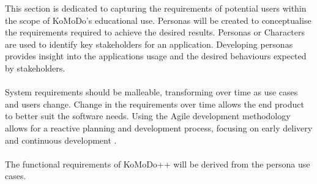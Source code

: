 \graphicspath{ {images/requirements/} }

This section is dedicated to capturing the requirements of potential users within the scope of KoMoDo's educational use. Personas will be created to conceptualise the requirements required to achieve the desired results. Personas or Characters are used to identify key stakeholders for an application. Developing personas provides insight into the applications usage and the desired behaviours expected by stakeholders.\\\\
%
System requirements should be malleable, transforming over time as use cases and users change. Change in the requirements over time allows the end product to better suit the software needs. Using the Agile development methodology allows for a reactive planning and development process, focusing on early delivery and continuous development \cite{wikipedia_agile_dev}.\\\\
%
The functional requirements of KoMoDo++ will be derived from the persona use cases.

